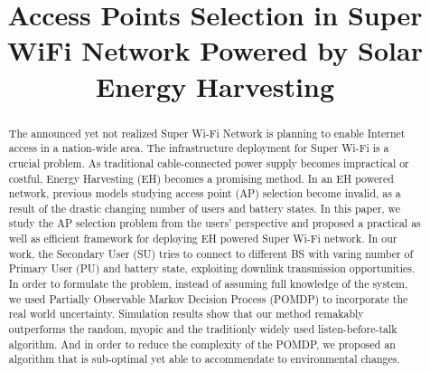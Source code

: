 \documentclass[conference]{IEEEtran}
\begin{document}
\title{Access Points Selection in Super WiFi Network Powered by Solar Energy Harvesting}

\author{
	\small{}}
\maketitle

\begin{abstract}
The announced yet not realized Super Wi-Fi Network is planning to enable Internet access in a nation-wide area.
The infrastructure deployment for Super Wi-Fi is a crucial problem. 
As traditional cable-connected power supply becomes impractical or costful, Energy Harvesting (EH) becomes a promising method.
In an EH powered network, previous models studying access point (AP) selection become invalid, 
as a result of the drastic changing number of users and battery states.
In this paper, we study the AP selection problem from the users' perspective 
and proposed a practical as well as efficient framework for deploying EH powered Super Wi-Fi network.
In our work, the Secondary User (SU) tries to connect to different BS with varing number of Primary User (PU)
and battery state, exploiting downlink transmission opportunities.
In order to formulate the problem, instead of assuming full knowledge of the system,
we used Partially Observable Markov Decision Process (POMDP) to incorporate the 
real world uncertainty. 
Simulation results show that our method remakably outperforms the random, myopic 
and the traditionly widely used listen-before-talk algorithm.
And in order to reduce the complexity of the POMDP, 
we proposed an algorithm that is sub-optimal yet able to accommendate to environmental changes.
\end{abstract}
\IEEEpeerreviewmaketitle
\end{document}
